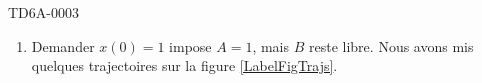 \begin{corrige}{TD6A-0003}
\begin{enumerate}
        \item

            Demander \( x(0)=1\) impose \( A=1\), mais \( B\) reste libre. Nous avons mis quelques trajectoires sur la figure \ref{LabelFigTrajs}.
            \newcommand{\CaptionFigTrajs}{Les trajectoires sont tracées pour \( t\) entre \( 0\) et \( 1\). Les points correspondent à \( t=0\). La courbe rouge correspond à \( B=-1\). Nous voyons qu'elle est sur la même trajectoire que \( B=1\), mais elle ne part pas du même point.}
            

    \end{enumerate}
    

\end{corrige}
